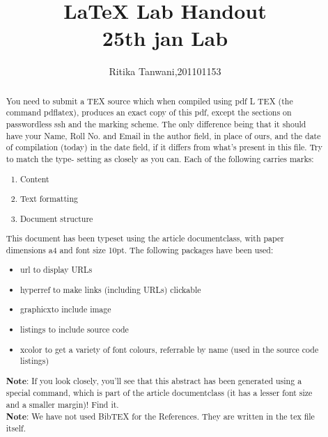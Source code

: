 \documentclass[10pt]{article}
\title{{\LaTeX}
	 Lab Handout \\25th jan Lab}
\begin{document}
       \maketitle
       \author{Ritika Tanwani,201101153}
       \begin{abstract}

You need to submit a TEX source which when compiled using pdf L TEX (the
	command pdflatex), produces an exact copy of this pdf, except the sections
on passwordless ssh and the marking scheme.
The only difference being that it should have your Name, Roll No. and Email
in the author field, in place of ours, and the date of compilation (today) in the
date field, if it differs from what’s present in this file. Try to match the type-
setting as closely as you can.
Each of the following carries marks:

\begin{enumerate}
  \item Content
    \item Text formatting
      \item Document structure
      \end{enumerate}
     This document has been typeset using the article documentclass, with paper
     dimensions a4 and font size 10pt.
     The following packages have been used:
     \begin{itemize}
     \item{\textsf{url} to display URLs}
     \item{\textsf{ hyperref} to make links (including URLs) clickable}
	     
     \item{\textsf {graphicx}to include image}
     \item{\textsf {listings} to include source code}
     
     \item{\textsf {xcolor} to get a variety of font colours, referrable by name (used in the
		     source code listings)
     }
\end{itemize}
\textbf{Note}: If you look closely, you’ll see that this abstract has been generated
using a special command, which is part of the article documentclass (it has a
		lesser font size and a smaller margin)! Find it.\\
\textbf{Note}: We have not used BibTEX for the References. They are written in
the tex file itself.

       \end{abstract}
\end{document}
